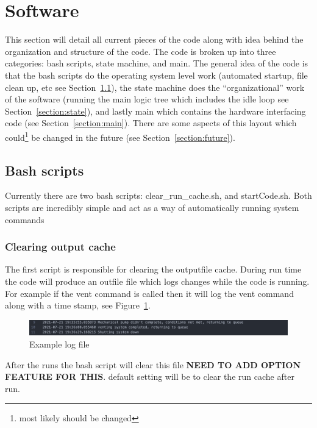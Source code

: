 \documentclass{article}
\begin{document}
\section{Software}
This section will detail all current pieces of the code along with idea behind the organization and structure of the code. The code is broken up into three categories: bash scripts, state machine, and main. The general idea of the code is that the bash scripts do the operating system level work (automated startup, file clean up, etc see Section~\ref{section:bash}), the state machine does the ``organizational'' work of the software (running the main logic tree which includes the idle loop see Section~\ref{section:state}), and lastly main which contains the hardware interfacing code (see Section~\ref{section:main}). There are some aspects of this layout which could\footnote{most likely should be changed} be changed in the future (see Section~\ref{section:future}).
\subsection{Bash scripts}
\label{section:bash}
Currently there are two bash scripts: clear\_run\_cache.sh, and startCode.sh. Both scripts are incredibly simple and act as a way of automatically running system commands

\subsubsection{Clearing output cache}
The first script is responsible for clearing the outputfile cache. During run time the code will produce an outfile file which logs changes while the code is running. For example if the vent command is called then it will log the vent command along with a time stamp, see Figure~\ref{fig:logfile}. 
\begin{center}
    \begin{figure}[h!]
      \includegraphics[scale=0.4]{image1.png}
      \caption{Example log file}
      \label{fig:logfile}
    \end{figure}
\end{center}


After the runs the bash script will clear this file \textbf{NEED TO ADD OPTION FEATURE FOR THIS}. default setting will be to clear the run cache after run.\\
\end{document}
